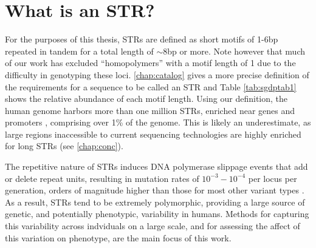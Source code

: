 \section{What is an STR?}%
For the purposes of this thesis, STRs are defined as short motifs of 1-6bp repeated in tandem for a total length of $\sim$8bp or more. Note however that much of our work has excluded ``homopolymers'' with a motif length of 1 due to the difficulty in genotyping these loci. \autoref{chap:catalog} gives a more precise definition of the requirements for a sequence to be called an STR and Table \ref{tab:sgdptab1} shows the relative abundance of each motif length. Using our definition, the human genome harbors more than one million STRs, enriched near genes and promoters \cite{SawayaBagshawBuschiazzoEtAl2013}, comprising over 1\% of the genome. This is likely an underestimate, as large regions inaccessible to current sequencing technologies are highly enriched for long STRs (see \autoref{chap:conc}).

The repetitive nature of STRs induces DNA polymerase slippage events that add or delete repeat units, resulting in mutation rates of $10^{-3}-10^{-4}$ per locus per generation, orders of magnitude higher than those for most other variant types \cite{Ellegren2004,WeberWong1993}. As a result, STRs tend to be extremely polymorphic, providing a large source of genetic, and potentially phenotypic, variability in humans. Methods for capturing this variability across indviduals on a large scale, and for assessing the affect of this variation on phenotype, are the main focus of this work.


